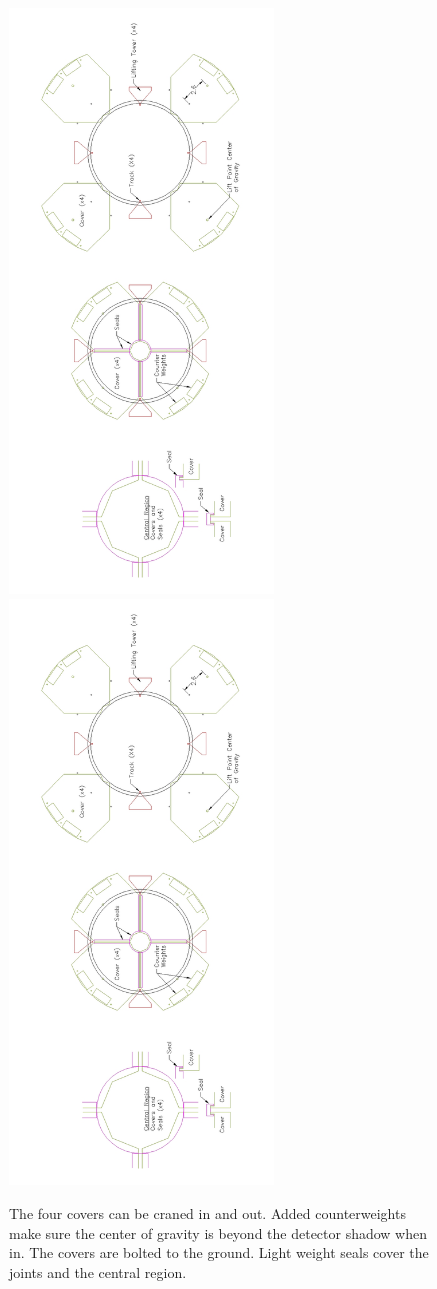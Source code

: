 \begin{figure}[htpb]
\centering\includegraphics[bb=0 0 800 1000,clip,width=7cm,angle=270]{figures/fig3-4.jpg}
\centering\includegraphics[bb=0 1000 800 1800,clip,width=7cm,angle=270]{figures/fig3-4.jpg}
\caption{The four covers can be craned in and out. Added counterweights make sure the center of
 gravity is beyond the detector shadow when in. The covers are bolted to the ground. Light weight seals
 cover the joints and the central region.}
\label{fig:detcover}
\end{figure}

